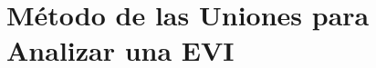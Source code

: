 \documentclass[ 10pt, xcolor = dvipsnames]{beamer}
\begin{document}
\section{M\'etodo de las Uniones para Analizar una EVI}

\begin{frame}[allowframebreaks]
\frametitle{\insertsection}

\begin{figure}
\centering
\def\svgwidth{0.9\columnwidth}

\end{figure}

\framebreak

\begin{figure}
\centering
\def\svgwidth{0.9\columnwidth}

\end{figure}

\framebreak

\begin{figure}
\centering
\def\svgwidth{0.9\columnwidth}

\end{figure}

\end{frame}
\end{document}
